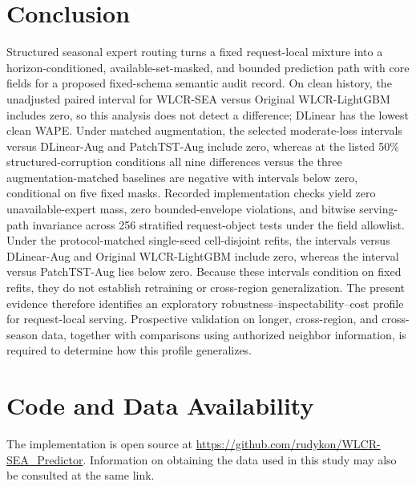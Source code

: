 \documentclass[10pt,conference,letterpaper]{IEEEtran}
\newcommand{\method}{WLCR-SEA}
\newcommand{\originalmethod}{Original WLCR-LightGBM}
\begin{document}
\section{Conclusion}
Structured seasonal expert routing turns a fixed request-local mixture into a horizon-conditioned, available-set-masked, and bounded prediction path with core fields for a proposed fixed-schema semantic audit record. On clean history, the unadjusted paired interval for \method{} versus \originalmethod{} includes zero, so this analysis does not detect a difference; DLinear has the lowest clean WAPE. Under matched augmentation, the selected moderate-loss intervals versus DLinear-Aug and PatchTST-Aug include zero, whereas at the listed 50\% structured-corruption conditions all nine differences versus the three augmentation-matched baselines are negative with intervals below zero, conditional on five fixed masks. Recorded implementation checks yield zero unavailable-expert mass, zero bounded-envelope violations, and bitwise serving-path invariance across 256 stratified request-object tests under the field allowlist. Under the protocol-matched single-seed cell-disjoint refits, the intervals versus DLinear-Aug and \originalmethod{} include zero, whereas the interval versus PatchTST-Aug lies below zero. Because these intervals condition on fixed refits, they do not establish retraining or cross-region generalization. The present evidence therefore identifies an exploratory robustness--inspectability--cost profile for request-local serving. Prospective validation on longer, cross-region, and cross-season data, together with comparisons using authorized neighbor information, is required to determine how this profile generalizes.

\section*{Code and Data Availability}
The implementation is open source at
\url{https://github.com/rudykon/WLCR-SEA_Predictor}.
Information on obtaining the data used in this study may also be consulted at the same link.



\end{document}
